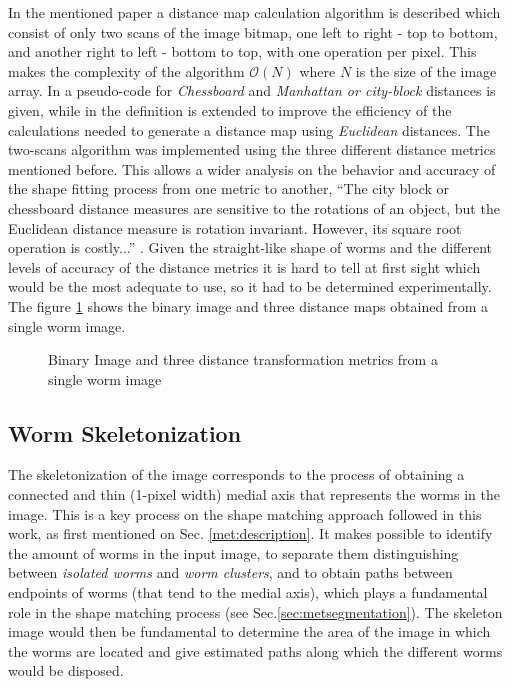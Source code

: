 In the mentioned paper a distance map calculation algorithm is described which consist
of only two scans of the image bitmap, one left to right - top to bottom, and another
right to left - bottom to top, with one operation per pixel. This makes the complexity
of the algorithm $\mathcal{O}(N)$ where $N$ is the size of the image array.
In \cite[p.197]{fastdt} a pseudo-code for \emph{Chessboard} and 
\emph{Manhattan or city-block} distances is given, while in \cite[p.198]{fastdt} the 
definition is extended to improve the efficiency of the calculations needed to 
generate a distance map using \emph{Euclidean} distances.
The two-scans algorithm was implemented using the three different distance metrics
mentioned before. This allows a wider analysis on the behavior and accuracy of the shape 
fitting process from one metric to another, ``The city block or chessboard distance
measures are sensitive to the rotations of an object, but the Euclidean distance
measure is rotation invariant. However, its square root operation is costly...''
\cite[p.332]{eucskeleton}. Given the straight-like shape of worms and the different levels
of accuracy of the distance metrics it is hard to tell at first sight which would be 
the most adequate to use, so it had to be determined experimentally.
The figure \ref{fig:distance} shows the binary image and three distance maps obtained 
from a single worm image.

\begin{figure}[h t b p ! H]
  \centering
\qquad
\qquad                
\qquad
  \caption{Binary Image and three distance transformation metrics from a single worm image}
  \label{fig:distance}
\end{figure}


\subsection{Worm Skeletonization}
\label{sec:metsk}

The skeletonization of the image corresponds to the process of obtaining a 
connected and thin (1-pixel width) medial axis that represents the worms in the 
image. This is a key process on the shape matching
approach followed in this work, as first mentioned on Sec. \ref{met:description}.
It makes possible to identify the amount of worms in the input image, to separate them 
distinguishing between \emph{isolated worms} and \emph{worm clusters}, and to
obtain paths between endpoints 
of worms (that tend to the medial axis), which plays a fundamental role in the 
shape matching process (see Sec.\ref{sec:metsegmentation}). The skeleton
image would then be fundamental to determine the area of the image in which
the worms are located and give estimated paths along which the different
worms would be disposed. \\

